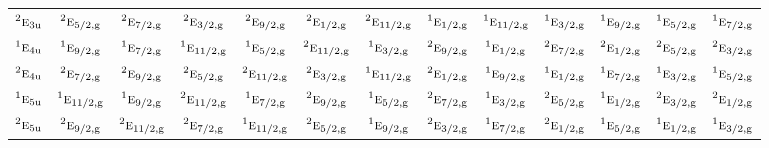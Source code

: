 \documentclass[10pt,a4paper]{article}
\numberwithin{equation}{section}
\newcommand{\irr}[1]{\text{\normalfont\scshape #1}}
\newcommand{\conjpair}[1]{{}^{#1}}
\newcommand{\ptag}[1]{\mathrm{#1}}
\begin{document}
{\begin{longtable}{@{}lcccccccccccc@{}}
$\conjpair{2}\irr{e}_{3\ptag{u}}$ & $\conjpair{2}\irr{e}_{5/2,\ptag{g}}$ & $\conjpair{2}\irr{e}_{7/2,\ptag{g}}$ & $\conjpair{2}\irr{e}_{3/2,\ptag{g}}$ & $\conjpair{2}\irr{e}_{9/2,\ptag{g}}$ & $\conjpair{2}\irr{e}_{1/2,\ptag{g}}$ & $\conjpair{2}\irr{e}_{11/2,\ptag{g}}$ & $\conjpair{1}\irr{e}_{1/2,\ptag{g}}$ & $\conjpair{1}\irr{e}_{11/2,\ptag{g}}$ & $\conjpair{1}\irr{e}_{3/2,\ptag{g}}$ & $\conjpair{1}\irr{e}_{9/2,\ptag{g}}$ & $\conjpair{1}\irr{e}_{5/2,\ptag{g}}$ & $\conjpair{1}\irr{e}_{7/2,\ptag{g}}$\\
$\conjpair{1}\irr{e}_{4\ptag{u}}$ & $\conjpair{1}\irr{e}_{9/2,\ptag{g}}$ & $\conjpair{1}\irr{e}_{7/2,\ptag{g}}$ & $\conjpair{1}\irr{e}_{11/2,\ptag{g}}$ & $\conjpair{1}\irr{e}_{5/2,\ptag{g}}$ & $\conjpair{2}\irr{e}_{11/2,\ptag{g}}$ & $\conjpair{1}\irr{e}_{3/2,\ptag{g}}$ & $\conjpair{2}\irr{e}_{9/2,\ptag{g}}$ & $\conjpair{1}\irr{e}_{1/2,\ptag{g}}$ & $\conjpair{2}\irr{e}_{7/2,\ptag{g}}$ & $\conjpair{2}\irr{e}_{1/2,\ptag{g}}$ & $\conjpair{2}\irr{e}_{5/2,\ptag{g}}$ & $\conjpair{2}\irr{e}_{3/2,\ptag{g}}$\\
$\conjpair{2}\irr{e}_{4\ptag{u}}$ & $\conjpair{2}\irr{e}_{7/2,\ptag{g}}$ & $\conjpair{2}\irr{e}_{9/2,\ptag{g}}$ & $\conjpair{2}\irr{e}_{5/2,\ptag{g}}$ & $\conjpair{2}\irr{e}_{11/2,\ptag{g}}$ & $\conjpair{2}\irr{e}_{3/2,\ptag{g}}$ & $\conjpair{1}\irr{e}_{11/2,\ptag{g}}$ & $\conjpair{2}\irr{e}_{1/2,\ptag{g}}$ & $\conjpair{1}\irr{e}_{9/2,\ptag{g}}$ & $\conjpair{1}\irr{e}_{1/2,\ptag{g}}$ & $\conjpair{1}\irr{e}_{7/2,\ptag{g}}$ & $\conjpair{1}\irr{e}_{3/2,\ptag{g}}$ & $\conjpair{1}\irr{e}_{5/2,\ptag{g}}$\\
$\conjpair{1}\irr{e}_{5\ptag{u}}$ & $\conjpair{1}\irr{e}_{11/2,\ptag{g}}$ & $\conjpair{1}\irr{e}_{9/2,\ptag{g}}$ & $\conjpair{2}\irr{e}_{11/2,\ptag{g}}$ & $\conjpair{1}\irr{e}_{7/2,\ptag{g}}$ & $\conjpair{2}\irr{e}_{9/2,\ptag{g}}$ & $\conjpair{1}\irr{e}_{5/2,\ptag{g}}$ & $\conjpair{2}\irr{e}_{7/2,\ptag{g}}$ & $\conjpair{1}\irr{e}_{3/2,\ptag{g}}$ & $\conjpair{2}\irr{e}_{5/2,\ptag{g}}$ & $\conjpair{1}\irr{e}_{1/2,\ptag{g}}$ & $\conjpair{2}\irr{e}_{3/2,\ptag{g}}$ & $\conjpair{2}\irr{e}_{1/2,\ptag{g}}$\\
$\conjpair{2}\irr{e}_{5\ptag{u}}$ & $\conjpair{2}\irr{e}_{9/2,\ptag{g}}$ & $\conjpair{2}\irr{e}_{11/2,\ptag{g}}$ & $\conjpair{2}\irr{e}_{7/2,\ptag{g}}$ & $\conjpair{1}\irr{e}_{11/2,\ptag{g}}$ & $\conjpair{2}\irr{e}_{5/2,\ptag{g}}$ & $\conjpair{1}\irr{e}_{9/2,\ptag{g}}$ & $\conjpair{2}\irr{e}_{3/2,\ptag{g}}$ & $\conjpair{1}\irr{e}_{7/2,\ptag{g}}$ & $\conjpair{2}\irr{e}_{1/2,\ptag{g}}$ & $\conjpair{1}\irr{e}_{5/2,\ptag{g}}$ & $\conjpair{1}\irr{e}_{1/2,\ptag{g}}$ & $\conjpair{1}\irr{e}_{3/2,\ptag{g}}$\\

\end{longtable}}
\end{document}
